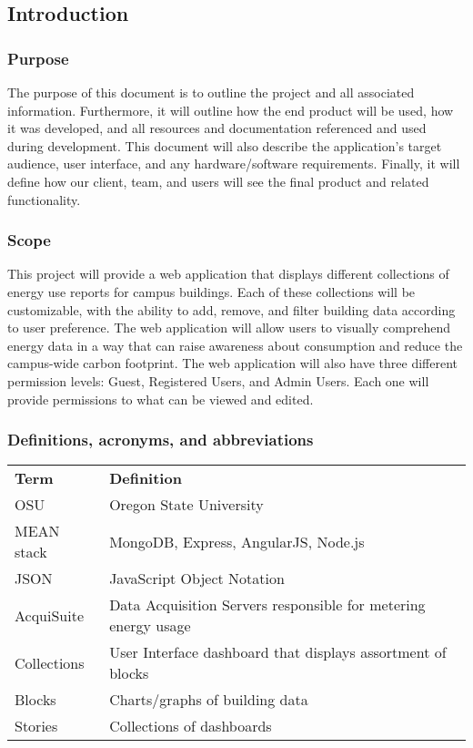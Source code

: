 \subsection{Introduction}

    \subsubsection{Purpose}
    The purpose of this document is to outline the project and all associated information. Furthermore, it will outline how the end product will be used, how it was developed, and all resources and documentation referenced and used during development. This document will also describe the application’s target audience, user interface, and any hardware/software requirements. Finally, it will define how our client, team, and users will see the final product and related functionality.
    \subsubsection{Scope}
    This project will provide a web application that displays different collections of energy use reports for campus buildings. Each of these collections will be customizable, with the ability to add, remove, and filter building data according to user preference. The web application will allow users to visually comprehend energy data in a way that can raise awareness about consumption and reduce the campus-wide carbon footprint. The web application will also have three different permission levels: Guest, Registered Users, and Admin Users. Each one will provide permissions to what can be viewed and edited.

    \subsubsection{Definitions, acronyms, and abbreviations} \label{definition}
    \begin{table}[h]
    \centering
    \begin{tabular}{ll}
    \textbf{Term} & \textbf{Definition} \\
    OSU & Oregon State University \\
    MEAN stack & MongoDB, Express, AngularJS, Node.js \\
    JSON & JavaScript Object Notation \\
    AcquiSuite & Data Acquisition Servers responsible for metering energy usage \\
    Collections & User Interface dashboard that displays assortment of blocks \\
    Blocks & Charts/graphs of building data \\
    Stories & Collections of dashboards 
    \end{tabular}
    \end{table}
